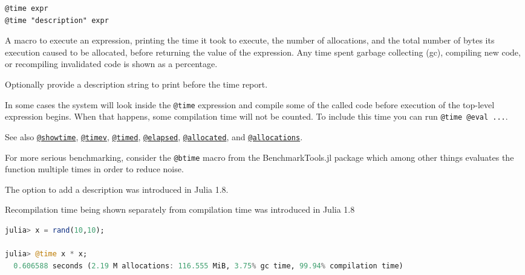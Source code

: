 \begin{adjustwidth}{2em}{0pt}


\begin{lstlisting}[]
@time expr
@time "description" expr
\end{lstlisting}

A macro to execute an expression, printing the time it took to execute, the number of allocations, and the total number of bytes its execution caused to be allocated, before returning the value of the expression. Any time spent garbage collecting (gc), compiling new code, or recompiling invalidated code is shown as a percentage.

Optionally provide a description string to print before the time report.

In some cases the system will look inside the \texttt{@time} expression and compile some of the called code before execution of the top-level expression begins. When that happens, some compilation time will not be counted. To include this time you can run \texttt{@time @eval ...}.

See also \href{@ref}{\texttt{@showtime}}, \href{@ref}{\texttt{@timev}}, \href{@ref}{\texttt{@timed}}, \href{@ref}{\texttt{@elapsed}}, \href{@ref}{\texttt{@allocated}}, and \href{@ref}{\texttt{@allocations}}.

\begin{tcolorbox}[toptitle=-1mm,bottomtitle=1mm,colback=admonition-note!50!white,colframe=admonition-note,title=\textbf{Note}]
For more serious benchmarking, consider the \texttt{@btime} macro from the BenchmarkTools.jl package which among other things evaluates the function multiple times in order to reduce noise.

\end{tcolorbox}
\begin{tcolorbox}[toptitle=-1mm,bottomtitle=1mm,colback=admonition-compat!50!white,colframe=admonition-compat,title=\textbf{Julia 1.8}]
The option to add a description was introduced in Julia 1.8.

Recompilation time being shown separately from compilation time was introduced in Julia 1.8

\end{tcolorbox}

\begin{lstlisting}[language=julia, style=jlcodestyle]
julia> x = rand(10,10);

julia> @time x * x;
  0.606588 seconds (2.19 M allocations: 116.555 MiB, 3.75% gc time, 99.94% compilation time)


\end{lstlisting}
\end{adjustwidth}
